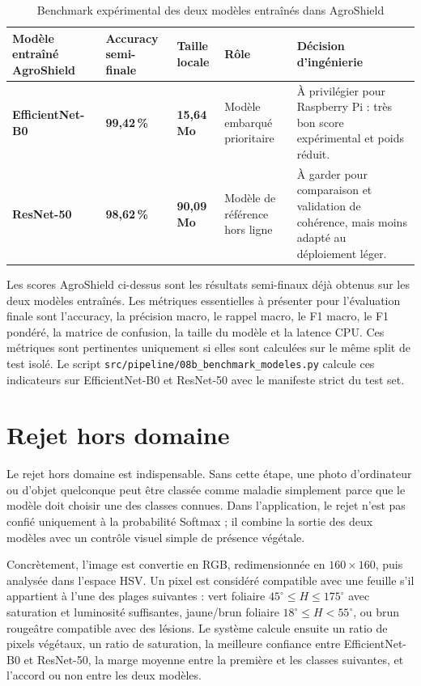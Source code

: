 ﻿\documentclass[11pt,a4paper,openany]{report}
\begin{document}
\begin{table}[H]
\centering
\small
\renewcommand{\arraystretch}{1.25}
\begin{tabular}{|p{3.2cm}|C{2.4cm}|C{2.4cm}|C{2.4cm}|p{4.5cm}|}
\hline
\textbf{Modèle entraîné AgroShield} & \textbf{Accuracy semi-finale} & \textbf{Taille locale} & \textbf{Rôle} & \textbf{Décision d'ingénierie} \\
\hline
\textbf{EfficientNet-B0} & \textbf{99,42\,\%} & \textbf{15,64 Mo} & Modèle embarqué prioritaire & À privilégier pour Raspberry Pi : très bon score expérimental et poids réduit. \\
\hline
\textbf{ResNet-50} & \textbf{98,62\,\%} & \textbf{90,09 Mo} & Modèle de référence hors ligne & À garder pour comparaison et validation de cohérence, mais moins adapté au déploiement léger. \\
\hline
\end{tabular}
\caption{Benchmark expérimental des deux modèles entraînés dans AgroShield}
\label{tab:benchmark_agroshield_modeles}
\end{table}

Les scores AgroShield ci-dessus sont les résultats semi-finaux déjà obtenus sur les deux modèles entraînés. Les métriques essentielles à présenter pour l'évaluation finale sont l'accuracy, la précision macro, le rappel macro, le F1 macro, le F1 pondéré, la matrice de confusion, la taille du modèle et la latence CPU. Ces métriques sont pertinentes uniquement si elles sont calculées sur le même split de test isolé. Le script \texttt{src/pipeline/08b\_benchmark\_modeles.py} calcule ces indicateurs sur EfficientNet-B0 et ResNet-50 avec le manifeste strict du test set.

\section{Rejet hors domaine}
Le rejet hors domaine est indispensable. Sans cette étape, une photo d'ordinateur ou d'objet quelconque peut être classée comme maladie simplement parce que le modèle doit choisir une des classes connues. Dans l'application, le rejet n'est pas confié uniquement à la probabilité Softmax ; il combine la sortie des deux modèles avec un contrôle visuel simple de présence végétale.

Concrètement, l'image est convertie en RGB, redimensionnée en \(160 \times 160\), puis analysée dans l'espace HSV. Un pixel est considéré compatible avec une feuille s'il appartient à l'une des plages suivantes : vert foliaire \(45^\circ \leq H \leq 175^\circ\) avec saturation et luminosité suffisantes, jaune/brun foliaire \(18^\circ \leq H < 55^\circ\), ou brun rougeâtre compatible avec des lésions. Le système calcule ensuite un ratio de pixels végétaux, un ratio de saturation, la meilleure confiance entre EfficientNet-B0 et ResNet-50, la marge moyenne entre la première et les classes suivantes, et l'accord ou non entre les deux modèles.
\end{document}
